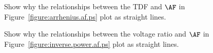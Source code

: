 \begin{exercise}
Show why the relationships between the TDF and $\AF$
in Figure~\ref{figure:arrhenius.af.ps}
plot as straight lines.
\end{exercise}


\begin{exercise}
Show why the relationships between the voltage ratio and $\AF$
in Figure~\ref{figure:inverse.power.af.ps}
plot as straight lines.
\end{exercise}









